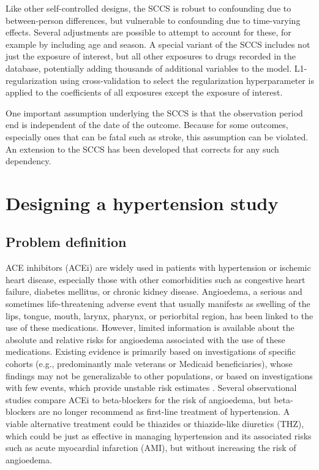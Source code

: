 \documentclass[11pt]{book}
\begin{document}
Like other self-controlled designs, the SCCS is robust to confounding
due to between-person differences, but vulnerable to confounding due to
time-varying effects. Several adjustments are possible to attempt to
account for these, for example by including age and season. A special
variant of the SCCS includes not just the exposure of interest, but all
other exposures to drugs recorded in the database, \citep{simpson_2013}
potentially adding thousands of additional variables to the model.
L1-regularization using cross-validation to select the regularization
hyperparameter is applied to the coefficients of all exposures except
the exposure of interest.

One important assumption underlying the SCCS is that the observation
period end is independent of the date of the outcome. Because for some
outcomes, especially ones that can be fatal such as stroke, this
assumption can be violated. An extension to the SCCS has been developed
that corrects for any such dependency. \citep{farrington_2011}

\section{Designing a hypertension
study}\label{designing-a-hypertension-study}

\subsection{Problem definition}\label{problem-definition-1}

ACE inhibitors (ACEi) are widely used in patients with hypertension or
ischemic heart disease, especially those with other comorbidities such
as congestive heart failure, diabetes mellitus, or chronic kidney
disease. \citep{zaman_2002} Angioedema, a serious and sometimes
life-threatening adverse event that usually manifests as swelling of the
lips, tongue, mouth, larynx, pharynx, or periorbital region, has been
linked to the use of these medications. \citep{sabroe_1997} However,
limited information is available about the absolute and relative risks
for angioedema associated with the use of these medications. Existing
evidence is primarily based on investigations of specific cohorts (e.g.,
predominantly male veterans or Medicaid beneficiaries), whose findings
may not be generalizable to other populations, or based on
investigations with few events, which provide unstable risk estimates
\citep{powers_2012}. Several observational studies compare ACEi to
beta-blockers for the risk of angioedema, \citep{magid_2010, toh_2012}
but beta-blockers are no longer recommend as first-line treatment of
hypertension. \citep{whelton_2018} A viable alternative treatment could
be thiazides or thiazide-like diuretics (THZ), which could be just as
effective in managing hypertension and its associated risks such as
acute myocardial infarction (AMI), but without increasing the risk of
angioedema.
\end{document}

